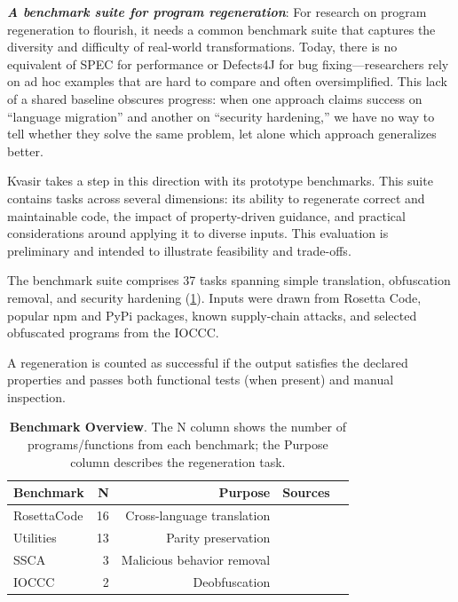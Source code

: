 \documentclass[sigplan,review,anonymous,10pt]{acmart}
\newcommand{\heading}[1]{\vspace{2pt}\noindent\textbf{\emph{#1}}:\enspace}
\begin{document}
\heading{A benchmark suite for program regeneration}
For research on program regeneration to flourish, it needs a common benchmark
suite that captures the diversity and difficulty of real-world transformations.
Today, there is no equivalent of SPEC for performance or Defects4J for bug
fixing—researchers rely on ad hoc examples that are hard to compare and often
oversimplified. This lack of a shared baseline obscures progress: when one
approach claims success on “language migration” and another on “security
hardening,” we have no way to tell whether they solve the same problem, let
alone which approach generalizes better.

Kvasir takes a step in this direction with its prototype benchmarks.
This suite contains tasks across several dimensions: its
ability to regenerate correct and maintainable
code, the impact of property-driven guidance,
and practical considerations around applying it
to diverse inputs. This evaluation is
preliminary and intended to illustrate
feasibility and trade-offs.

The benchmark suite comprises 37 tasks spanning simple translation, obfuscation
removal, and security hardening (\cref{tab:benchmarks}). Inputs were drawn
from Rosetta Code, popular npm and PyPi packages, known supply-chain attacks,
and selected obfuscated programs from the IOCCC.

A regeneration is counted as successful if the output satisfies the declared
properties and passes both functional tests (when present) and manual inspection.

\begin{table}[t]
\centering
\caption{\textbf{Benchmark Overview}. 
The N column shows the number of programs/functions from each benchmark;
the Purpose column describes the regeneration task.}
\begin{tabular}{lrrll}
\toprule
Benchmark   & N  & Purpose                    & Sources \\
\midrule
RosettaCode & 16 & Cross-language translation & \cite{rosettacode} \\
Utilities   & 13 & Parity preservation        & \cite{regbench2025} \\
SSCA        & 3  & Malicious behavior removal & \cite{ohm2020backstabber,ev:eurosec:2022} \\
IOCCC       & 2  & Deobfuscation              & \cite{ioccc} \\
\bottomrule
\end{tabular}
\label{tab:benchmarks}
\end{table}
\end{document}
